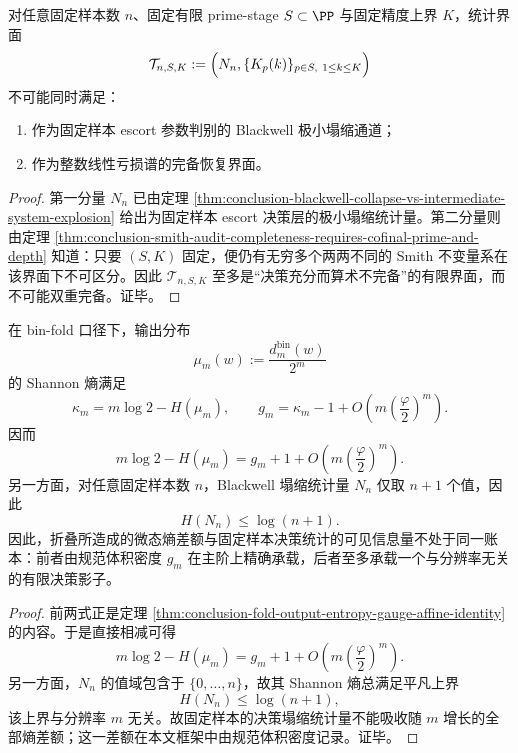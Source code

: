 \begin{corollary}\label{cor:conclusion-no-finite-interface-blackwell-and-smith-both-complete}
对任意固定样本数 \(n\)、固定有限 prime-stage \(S\subset\PP\) 与固定精度上界 \(K\)，统计界面
\[
\mathcal T_{n,S,K}:=\Bigl(N_n,\{K_p(k)\}_{p\in S,\ 1\le k\le K}\Bigr)
\]
不可能同时满足：
\begin{enumerate}
  \item 作为固定样本 escort 参数判别的 Blackwell 极小塌缩通道；
  \item 作为整数线性亏损谱的完备恢复界面。
\end{enumerate}
\end{corollary}
\begin{proof}
第一分量 \(N_n\) 已由定理 \ref{thm:conclusion-blackwell-collapse-vs-intermediate-system-explosion} 给出为固定样本 escort 决策层的极小塌缩统计量。第二分量则由定理 \ref{thm:conclusion-smith-audit-completeness-requires-cofinal-prime-and-depth} 知道：只要 \((S,K)\) 固定，便仍有无穷多个两两不同的 Smith 不变量系在该界面下不可区分。因此 \(\mathcal T_{n,S,K}\) 至多是“决策充分而算术不完备”的有限界面，而不可能双重完备。证毕。
\end{proof}

\begin{theorem}\label{thm:conclusion-entropy-deficit-carried-by-gauge-not-fixed-sample-statistic}
在 bin-fold 口径下，输出分布
\[
\mu_m(w):=\frac{d_m^{\mathrm{bin}}(w)}{2^m}
\]
的 Shannon 熵满足
\[
\kappa_m=m\log 2-H(\mu_m),
\qquad
g_m=\kappa_m-1+O\!\left(m\left(\frac{\varphi}{2}\right)^m\right).
\]
因而
\[
m\log 2-H(\mu_m)=g_m+1+O\!\left(m\left(\frac{\varphi}{2}\right)^m\right).
\]
另一方面，对任意固定样本数 \(n\)，Blackwell 塌缩统计量 \(N_n\) 仅取 \(n+1\) 个值，因此
\[
H(N_n)\le \log(n+1).
\]
因此，折叠所造成的微态熵差额与固定样本决策统计的可见信息量不处于同一账本：前者由规范体积密度 \(g_m\) 在主阶上精确承载，后者至多承载一个与分辨率无关的有限决策影子。
\end{theorem}
\begin{proof}
前两式正是定理 \ref{thm:conclusion-fold-output-entropy-gauge-affine-identity} 的内容。于是直接相减可得
\[
m\log 2-H(\mu_m)=g_m+1+O\!\left(m\left(\frac{\varphi}{2}\right)^m\right).
\]
另一方面，\(N_n\) 的值域包含于 \(\{0,\dots,n\}\)，故其 Shannon 熵总满足平凡上界
\[
H(N_n)\le \log(n+1),
\]
该上界与分辨率 \(m\) 无关。故固定样本的决策塌缩统计量不能吸收随 \(m\) 增长的全部熵差额；这一差额在本文框架中由规范体积密度记录。证毕。
\end{proof}


